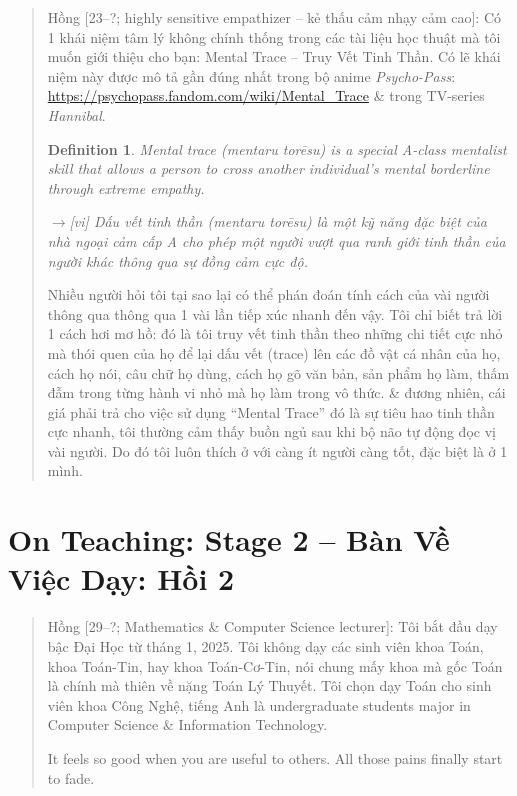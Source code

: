\documentclass[12pt,twoside]{book}
\newtheorem{definition}{Definition}[section]
\begin{document}
\begin{quote}
	{\sf Hồng [23--?; highly sensitive empathizer -- kẻ thấu cảm nhạy cảm cao]}: Có 1 khái niệm tâm lý không chính thống trong các tài liệu học thuật mà tôi muốn giới thiệu cho bạn: Mental Trace -- Truy Vết Tinh Thần. Có lẽ khái niệm này được mô tả gần đúng nhất trong bộ anime {\it Psycho-Pass}: \url{https://psychopass.fandom.com/wiki/Mental_Trace} \& trong TV-series {\it Hannibal}.
	
	\begin{definition}
		\emph{Mental trace} (mentaru torēsu) is a special A-class mentalist skill that allows a person to cross another individual's mental borderline through extreme empathy.
		
		{\sf[en]$\to$[vi]} \emph{Dấu vết tinh thần} (mentaru torēsu) là một kỹ năng đặc biệt của nhà ngoại cảm cấp A cho phép một người vượt qua ranh giới tinh thần của người khác thông qua sự đồng cảm cực độ.
	\end{definition}
	
	Nhiều người hỏi tôi tại sao lại có thể phán đoán tính cách của vài người thông qua thông qua 1 vài lần tiếp xúc nhanh đến vậy. Tôi chỉ biết trả lời 1 cách hơi mơ hồ: đó là tôi truy vết tinh thần theo những chi tiết cực nhỏ mà thói quen của họ để lại dấu vết (trace) lên các đồ vật cá nhân của họ, cách họ nói, câu chữ họ dùng, cách họ gõ văn bản, sản phẩm họ làm, thấm đẫm trong từng hành vi nhỏ mà họ làm trong vô thức. \& đương nhiên, cái giá phải trả cho việc sử dụng ``Mental Trace'' đó là sự tiêu hao tinh thần cực nhanh, tôi thường cảm thấy buồn ngủ sau khi bộ não tự động đọc vị vài người. Do đó tôi luôn thích ở với càng ít người càng tốt, đặc biệt là ở 1 mình.
\end{quote}


\chapter{On Teaching: Stage 2 -- Bàn Về Việc Dạy: Hồi 2}
\label{sect: teach stage 2}
\minitoc
\begin{quote}
	{\sf Hồng [29--?; Mathematics \& Computer Science lecturer]}: Tôi bắt đầu dạy bậc Đại Học từ tháng 1, 2025. Tôi không dạy các sinh viên khoa Toán, khoa Toán-Tin, hay khoa Toán-Cơ-Tin, nói chung mấy khoa mà gốc Toán là chính mà thiên về nặng Toán Lý Thuyết. Tôi chọn dạy Toán cho sinh viên khoa Công Nghệ, tiếng Anh là undergraduate students major in Computer Science \& Information Technology.
	
	It feels so good when you are useful to others. All those pains finally start to fade.
\end{quote}
\end{document}
